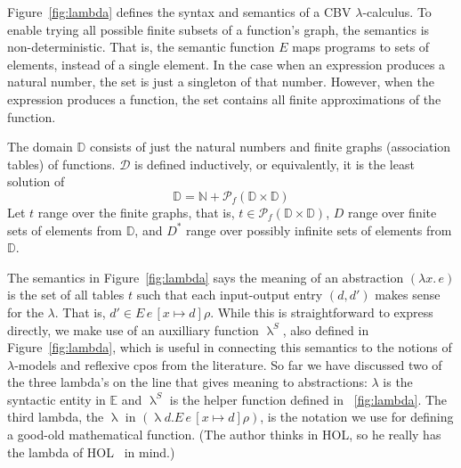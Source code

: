 \documentclass{tufte-handout}
\newcommand{\LAM}[1]{\lambda #1.\,}
\begin{document}
Figure~\ref{fig:lambda} defines the syntax and semantics of a CBV
$\lambda$-calculus. To enable trying all possible finite subsets of a
function's graph, the semantics is non-deterministic. That is, the
semantic function $E$ maps programs to sets of elements, instead of a
single element. In the case when an expression produces a natural
number, the set is just a singleton of that number. However, when the
expression produces a function, the set contains all finite
approximations of the function.

The domain $\mathbb{D}$ consists of just the natural numbers and
finite graphs (association tables) of functions.  $\mathcal{D}$ is
defined inductively, or equivalently, it is the least solution of
\[
   \mathbb{D} = \mathbb{N} + \mathcal{P}_f(\mathbb{D} \times \mathbb{D})
\]
Let $t$ range over the finite graphs, that is, $t \in
\mathcal{P}_f(\mathbb{D} \times \mathbb{D})$, $D$ range over finite
sets of elements from $\mathbb{D}$, and $D^{*}$ range over possibly
infinite sets of elements from $\mathbb{D}$.

The semantics in Figure~\ref{fig:lambda} says the meaning of an
abstraction $(\LAM{x}e)$ is the set of all tables $t$ such that each
input-output entry $(d,d')$ makes sense for the $\lambda$. That is,
$d' \in E\,e\,[x\mapsto d]\rho$. While this is straightforward to
express directly, we make use of an auxilliary function $\uplambda^S$,
also defined in Figure~\ref{fig:lambda}, which is useful in connecting
this semantics to the notions of $\lambda$-models and reflexive cpos
from the literature. So far we have discussed two of the three
lambda's on the line that gives meaning to abstractions: $\lambda$ is
the syntactic entity in $\mathbb{E}$ and $\uplambda^S$ is the helper
function defined in ~\ref{fig:lambda}.  The third lambda, the
$\uplambda$ in $(\uplambda d. E\,e\,[x\mapsto d]\rho)$, is the
notation we use for defining a good-old mathematical function.  (The
author thinks in HOL, so he really has the lambda of
HOL~\cite{Nipkow:2002jl} in mind.)
\end{document}
